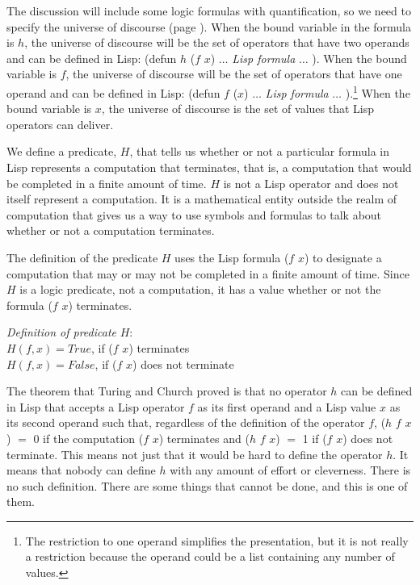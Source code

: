 The discussion will include some logic formulas with
quantification,
so we need to specify the universe of discourse
(page \pageref{def-universe-of-discourse}).
When the bound variable
in the formula is $h$, the universe of discourse
will be the set of operators that have
two operands and can be defined in Lisp:
\textsf{(defun $h$ ($f$ $x$)} $\dots$ \emph{Lisp formula} $\dots$ \textsf{)}.
When the bound variable is $f$,
the universe of discourse will be the set of operators
that have one operand and can be defined in Lisp:
\textsf{(defun $f$ ($x$)} $\dots$ \emph{Lisp formula} $\dots$ \textsf{)}.\footnote{The
restriction to one operand simplifies the presentation,
but it is not really a restriction because the operand could
be a list containing any number of values.}
When the bound variable is $x$, the universe of discourse
is the set of values that Lisp operators can deliver.

We define a predicate, $H$, that tells us whether or not
a particular formula in Lisp represents a computation that terminates,
that is, a computation that would be completed in a finite amount of time.
$H$ is not a Lisp operator and does not itself
represent a computation. It is a mathematical entity
outside the realm of computation that gives us a way
to use symbols and formulas to talk about
whether or not a computation terminates.

The definition of the predicate $H$ uses the Lisp
formula \textsf{($f$ $x$)} to designate a computation that may
or may not be completed in a finite amount of time.
Since $H$ is a logic predicate, not a computation,
it has a value whether or not the formula \textsf{($f$ $x$)} terminates.

\label{def:predicate-H}
\hspace*{5mm}\emph{Definition of predicate} $H$:\\
\hspace*{10mm}$H(f, x) = True$, if \textsf{($f$ $x$)} terminates\\
\hspace*{10mm}$H(f, x) = False$, if \textsf{($f$ $x$)} does not terminate

The theorem that Turing and Church proved is that
no operator $h$ can be defined in Lisp
that accepts a Lisp operator $f$ as its
first operand and a Lisp value $x$ as its second operand
such that, regardless of the definition of the operator $f$,
\textsf{($h$ $f$ $x$)} $=$ 0 if the computation \textsf{($f$ $x$)} terminates and
\textsf{($h$ $f$ $x$)} $=$ 1 if \textsf{($f$ $x$)} does not terminate.
This means not just that it would be hard to define the operator $h$.
It means that nobody can define $h$ with any amount of effort or cleverness.
There is no such definition.
There are some things that cannot be done, and this is one of them.

